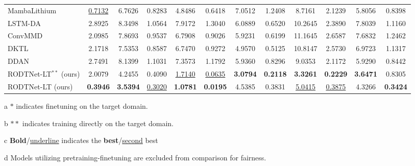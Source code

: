 \documentclass[lettersize,onecolumn]{IEEEtran}
\begin{document}
\begin{table}[htbp]
{\begin{threeparttable}
\begin{tabular}{lccccccccccc}
    MambaLithium \cite{shi2024mambalithiumselectivestatespace} & \underline{0.7132}  & 6.7626  & 0.8283  & 4.8486  & 0.6418  & 7.0512  & 1.2408  & 8.7161  & 2.1239  & 5.8056  & 0.8398  \\
    LSTM-DA \cite{HAN2022230823} & 2.8925  & 8.3498  & 1.0564  & 7.9172  & 1.3040  & 6.0889  & 0.6520  & 10.2645  & 2.3890  & 7.8039  & 1.1160  \\
    ConvMMD \cite{9788003} & 2.0985  & 7.8693  & 0.9537  & 6.7908  & 0.9026  & 5.9231  & 0.6199  & 11.1645  & 2.6587  & 7.6832  & 1.2462  \\
    DKTL \cite{10029904}  & 2.1718  & 7.5353  & 0.8587  & 6.7470  & 0.9272  & 4.9570  & 0.5125  & 10.8147  & 2.5730  & 6.9723  & 1.1317  \\
    DDAN \cite{9560040}  & 2.7491  & 8.1399  & 1.1031  & 7.3573  & 1.1792  & 5.9360  & 0.8296  & 9.0353  & 2.1172  & 5.9290  & 0.8442  \\
    RODTNet-LT$^{\ast\ast}$ {(ours)} & 2.0079  & 4.2455  & 0.4090  & \underline{1.7140}  & \underline{0.0635}  & \textbf{3.0794} & \textbf{0.2118} & \textbf{3.3261} & \textbf{0.2229} & \textbf{3.6471} & 0.8305  \\
    RODTNet-LT (ours) & \textbf{0.3946} & \textbf{3.5394} & \underline{0.3020}  & \textbf{1.0781} & \textbf{0.0195} & 4.5385  & 0.3831  & \underline{5.0415}  & \underline{0.3875}  & 4.3266  & \textbf{0.3424} \\
    \bottomrule
    \end{tabular}%
      \begin{tablenotes}
        \item[a] $\ast$ indicates finetuning on the target domain.
        \item[b] ${\ast\ast}$ indicates training directly on the target domain.
        \item[c] \textbf{Bold}/\underline{underline} indicates the \textbf{best}/\underline{second} best
        \item[d] Models utilizing pretraining-finetuning are excluded from comparison for fairness.
    \end{tablenotes}
\end{threeparttable}
}
    \label{tab:soh_results}%
\end{table}%



\end{document}
